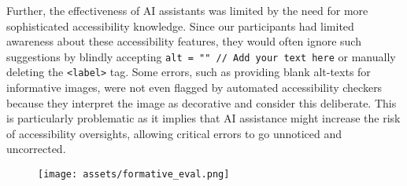 Further, the effectiveness of AI assistants was limited by the need for more sophisticated accessibility knowledge. Since our participants had limited awareness about these accessibility features, they would often ignore such suggestions by blindly accepting \colorbox{codebgd}{\texttt{alt = "" // Add your text here}} or manually deleting the \colorbox{codebgd}{\texttt{<label>}} tag. Some errors, such as providing blank alt-texts for informative images, were not even flagged by automated accessibility checkers because they interpret the image as decorative and consider this deliberate. This is particularly problematic as it implies that AI assistance might increase the risk of accessibility oversights, allowing critical errors to go unnoticed and uncorrected.


\begin{figure}
\texttt{[image: assets/formative\_eval.png]}

\end{figure}
